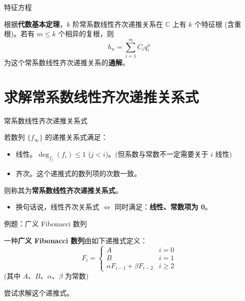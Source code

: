 \documentclass{beamer}
\begin{document}
\begin{frame}{特征方程}
    \begin{theorem}[常系数线性非齐次递推关系式的通解]
        根据\textbf{代数基本定理}，$k$ 阶常系数线性齐次递推关系在 $\mathbb C$ 上有 $k$ 个特征根 (含重根)。若有 $m \le k$ 个相异的复根，则
        $$
            h_n = \sum_{i=1}^m C_iq_i^n
        $$
        为这个常系数线性齐次递推关系的\textbf{通解}。
    \end{theorem}
\end{frame}

\section{求解常系数线性齐次递推关系式}

\begin{frame}{常系数线性齐次递推关系式}
    \begin{definition}
        若数列 $\{f_\infty\}$ 的递推关系式满足：
        \begin{itemize}
            \item 线性。$\deg_{f_j} (f_i) \leqslant 1$ ($j < i$)。(但系数与常数不一定需要关于 $i$ 线性)
            \item 齐次。这个递推式的数列项的次数一致。
        \end{itemize}
        则称其为\textbf{常系数线性齐次递推关系式}。
        \pause
        \begin{itemize}
            \item 换句话说，线性齐次关系式  $\Leftrightarrow$  同时满足：\textbf{线性、常数项为 0}。
        \end{itemize}
    \end{definition}    
\end{frame}

\begin{frame}{例题：广义 Fibonacci 数列}
    \begin{definition}
        一种\textbf{广义 Fibonacci 数列}由如下递推式定义：
        \begin{displaymath}
            F_i = \begin{cases} 
                A & i=0\\
                B & i=1\\
                \alpha F_{i-1} + \beta F_{i-2} & i\geqslant 2
              \end{cases}
        \end{displaymath}
        (其中 $A$、$B$、$\alpha$、$\beta$ 为常数)
        
        尝试求解这个递推式。
    \end{definition}    
\end{frame}
\end{document}
